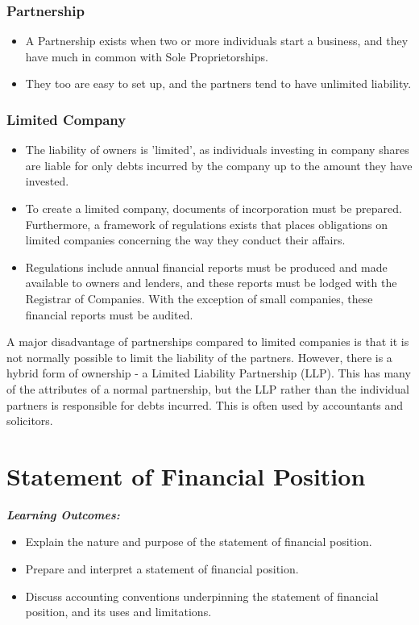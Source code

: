 \documentclass{report}
\newenvironment{blackbox}[1][Black]
  {\begin{tcolorbox}[colframe=#1,colback=white]}
  {\end{tcolorbox}}
\begin{document}
\subsection{Partnership}
\begin{itemize}
    \item A Partnership exists when two or more individuals start a business, and they have much in common with Sole Proprietorships.
    \item They too are easy to set up, and the partners tend to have unlimited liability.
\end{itemize}

\subsection{Limited Company}
\begin{itemize}
    \item The liability of owners is 'limited', as individuals investing in company shares are liable for only debts incurred by the company up to the amount they have invested.
    \item To create a limited company, documents of incorporation must be prepared. Furthermore, a framework of regulations exists that places obligations on limited companies concerning the way they conduct their affairs.
    \item Regulations include annual financial reports must be produced and made available to owners and lenders, and these reports must be lodged with the Registrar of Companies. With the exception of small companies, these financial reports must be audited.\\
\end{itemize}

A major disadvantage of partnerships compared to limited companies is that it is not normally possible to limit the liability of the partners. However, there is a hybrid form of ownership - a Limited Liability Partnership (LLP). This has many of the attributes of a normal partnership, but the LLP rather than the individual partners is responsible for debts incurred. This is often used by accountants and solicitors.

\chapter{Statement of Financial Position}
\begin{blackbox}
    \textbf{\textit{Learning Outcomes:}}\\
    \begin{itemize}
    \item Explain the nature and purpose of the statement of financial position.
    \item Prepare and interpret a statement of financial position.
    \item Discuss accounting conventions underpinning the statement of financial position, and its uses and limitations.
\end{itemize}
\end{blackbox}
\end{document}
